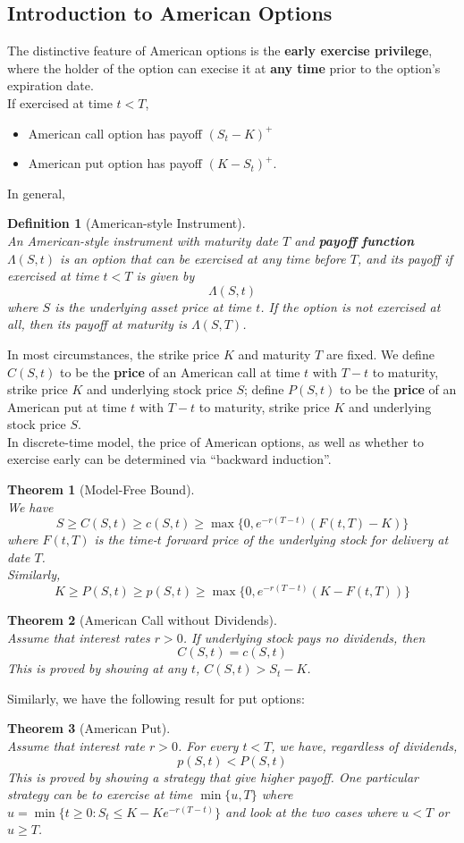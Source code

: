 \documentclass[12pt]{article}
\newtheorem{definition}{Definition}[section]
\newtheorem{theorem}{Theorem}[section]
\theoremstyle{definition}
\begin{document}
\subsection{Introduction to American Options}
The distinctive feature of American options is the \textbf{early exercise privilege}, where the holder of the option can execise it at \textbf{any time} prior to the option's expiration date.\\
If exercised at time $t<T$,
\begin{itemize}
  \item American call option has payoff $(S_t-K)^{+}$
  \item American put option has payoff $(K-S_t)^{+}$.
\end{itemize}
In general,
\begin{definition}[American-style Instrument]
\hfill\\\normalfont An American-style instrument with maturity date $T$ and \textbf{payoff function} $\Lambda(S,t)$ is an option that can be exercised at any time before $T$, and its payoff if exercised at time $t<T$ is given by
\[
\Lambda(S,t)
\] 
where $S$ is the underlying asset price at time $t$. If the option is not exercised at all, then its payoff at maturity is $\Lambda(S,T)$.
\end{definition}
In most circumstances, the strike price $K$ and maturity $T$ are fixed. We define $C(S,t)$ to be the \textbf{price} of an American call at time $t$ with $T-t$ to maturity, strike price $K$ and underlying stock price $S$; define $P(S,t)$ to be the \textbf{price} of an American put at time $t$ with $T-t$ to maturity, strike price $K$ and underlying stock price $S$.\\
In discrete-time model, the price of American options, as well as whether to exercise early can be determined via ``backward induction''.
\begin{theorem}[Model-Free Bound]
\hfill\\\normalfont We have
\[
S\geq C(S,t)\geq c(S,t)\geq \max\{0,e^{-r(T-t)}(F(t,T)-K)\}
\]
where $F(t,T)$ is the time-$t$ forward price of the underlying stock for delivery at date $T$.\\
Similarly, 
\[
K\geq P(S,t)\geq p(S,t)\geq \max\{0,e^{-r(T-t)}(K-F(t,T))\}
\]
\end{theorem}
\begin{theorem}[American Call without Dividends]
\hfill\\\normalfont Assume that interest rates $r>0$. If underlying stock pays no dividends, then
\[
C(S,t)=c(S,t)
\]
This is proved by showing at any $t$, $C(S,t)>S_t-K$.
\end{theorem}
Similarly, we have the following result for put options:
\begin{theorem}[American Put]
\hfill\\\normalfont Assume that interest rate $r>0$. For every $t<T$, we have, regardless of dividends,
\[
p(S,t)<P(S,t)
\]
This is proved by showing a strategy that give higher payoff. One particular strategy can be to exercise at time $\min\{u,T\}$ where $u=\min\{t\geq 0: S_t\leq K-Ke^{-r(T-t)}\}$ and look at the two cases where $u<T$ or $u\geq T$.
\end{theorem}
\end{document}
